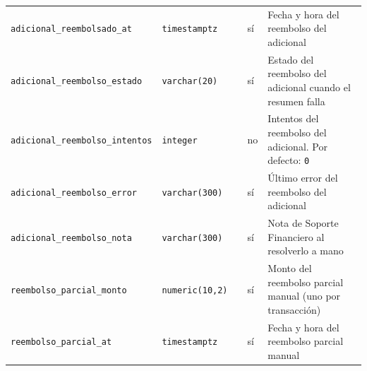 {\begin{xltabular}{\textwidth}{@{}>{\raggedright\arraybackslash}p{3.6cm} >{\raggedright\arraybackslash}p{2.3cm} >{\raggedright\arraybackslash}p{1cm} >{\centering\arraybackslash}p{0.85cm} L@{}}
    \texttt{adicional\_\allowbreak{}reembolsado\_\allowbreak{}at} & \texttt{timestamptz} &  & sí & Fecha y hora del reembolso del adicional \\
    \texttt{adicional\_\allowbreak{}reembolso\_\allowbreak{}estado} & \texttt{varchar(\allowbreak{}20)} &  & sí & Estado del reembolso del adicional cuando el resumen falla \\
    \texttt{adicional\_\allowbreak{}reembolso\_\allowbreak{}intentos} & \texttt{integer} &  & no & Intentos del reembolso del adicional. Por defecto: \texttt{0} \\
    \texttt{adicional\_\allowbreak{}reembolso\_\allowbreak{}error} & \texttt{varchar(\allowbreak{}300)} &  & sí & Último error del reembolso del adicional \\
    \texttt{adicional\_\allowbreak{}reembolso\_\allowbreak{}nota} & \texttt{varchar(\allowbreak{}300)} &  & sí & Nota de Soporte Financiero al resolverlo a mano \\
    \texttt{reembolso\_\allowbreak{}parcial\_\allowbreak{}monto} & \texttt{numeric(\allowbreak{}10,\allowbreak{}2)} &  & sí & Monto del reembolso parcial manual (uno por transacción) \\
    \texttt{reembolso\_\allowbreak{}parcial\_\allowbreak{}at} & \texttt{timestamptz} &  & sí & Fecha y hora del reembolso parcial manual \\
\end{xltabular}
}

